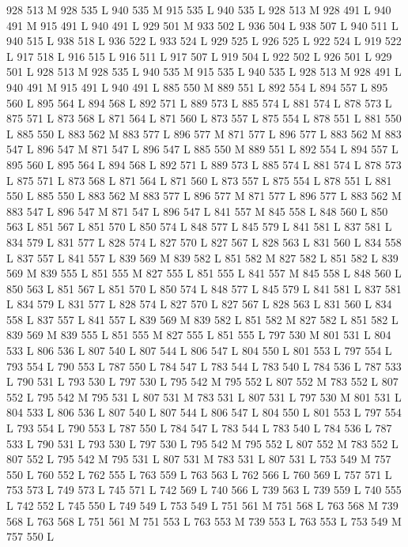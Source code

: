 {{{{{{{{{{{{{{{{{{928 513 M 928 535 L
940 535 M 915 535 L
940 535 L
928 513 M 928 491 L
940 491 M 915 491 L
940 491 L
929 501 M 933 502 L
936 504 L
938 507 L
940 511 L
940 515 L
938 518 L
936 522 L
933 524 L
929 525 L
926 525 L
922 524 L
919 522 L
917 518 L
916 515 L
916 511 L
917 507 L
919 504 L
922 502 L
926 501 L
929 501 L
928 513 M 928 535 L
940 535 M 915 535 L
940 535 L
928 513 M 928 491 L
940 491 M 915 491 L
940 491 L
885 550 M 889 551 L
892 554 L
894 557 L
895 560 L
895 564 L
894 568 L
892 571 L
889 573 L
885 574 L
881 574 L
878 573 L
875 571 L
873 568 L
871 564 L
871 560 L
873 557 L
875 554 L
878 551 L
881 550 L
885 550 L
883 562 M 883 577 L
896 577 M 871 577 L
896 577 L
883 562 M 883 547 L
896 547 M 871 547 L
896 547 L
885 550 M 889 551 L
892 554 L
894 557 L
895 560 L
895 564 L
894 568 L
892 571 L
889 573 L
885 574 L
881 574 L
878 573 L
875 571 L
873 568 L
871 564 L
871 560 L
873 557 L
875 554 L
878 551 L
881 550 L
885 550 L
883 562 M 883 577 L
896 577 M 871 577 L
896 577 L
883 562 M 883 547 L
896 547 M 871 547 L
896 547 L
841 557 M 845 558 L
848 560 L
850 563 L
851 567 L
851 570 L
850 574 L
848 577 L
845 579 L
841 581 L
837 581 L
834 579 L
831 577 L
828 574 L
827 570 L
827 567 L
828 563 L
831 560 L
834 558 L
837 557 L
841 557 L
839 569 M 839 582 L
851 582 M 827 582 L
851 582 L
839 569 M 839 555 L
851 555 M 827 555 L
851 555 L
841 557 M 845 558 L
848 560 L
850 563 L
851 567 L
851 570 L
850 574 L
848 577 L
845 579 L
841 581 L
837 581 L
834 579 L
831 577 L
828 574 L
827 570 L
827 567 L
828 563 L
831 560 L
834 558 L
837 557 L
841 557 L
839 569 M 839 582 L
851 582 M 827 582 L
851 582 L
839 569 M 839 555 L
851 555 M 827 555 L
851 555 L
797 530 M 801 531 L
804 533 L
806 536 L
807 540 L
807 544 L
806 547 L
804 550 L
801 553 L
797 554 L
793 554 L
790 553 L
787 550 L
784 547 L
783 544 L
783 540 L
784 536 L
787 533 L
790 531 L
793 530 L
797 530 L
795 542 M 795 552 L
807 552 M 783 552 L
807 552 L
795 542 M 795 531 L
807 531 M 783 531 L
807 531 L
797 530 M 801 531 L
804 533 L
806 536 L
807 540 L
807 544 L
806 547 L
804 550 L
801 553 L
797 554 L
793 554 L
790 553 L
787 550 L
784 547 L
783 544 L
783 540 L
784 536 L
787 533 L
790 531 L
793 530 L
797 530 L
795 542 M 795 552 L
807 552 M 783 552 L
807 552 L
795 542 M 795 531 L
807 531 M 783 531 L
807 531 L
753 549 M 757 550 L
760 552 L
762 555 L
763 559 L
763 563 L
762 566 L
760 569 L
757 571 L
753 573 L
749 573 L
745 571 L
742 569 L
740 566 L
739 563 L
739 559 L
740 555 L
742 552 L
745 550 L
749 549 L
753 549 L
751 561 M 751 568 L
763 568 M 739 568 L
763 568 L
751 561 M 751 553 L
763 553 M 739 553 L
763 553 L
753 549 M 757 550 L
}}}}}}}}}}}}}}}}}}
